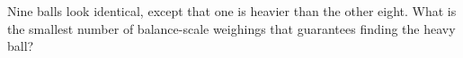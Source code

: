 Nine balls look identical, except that one is heavier than the other eight. What is the smallest number of balance-scale weighings that guarantees finding the heavy ball?
